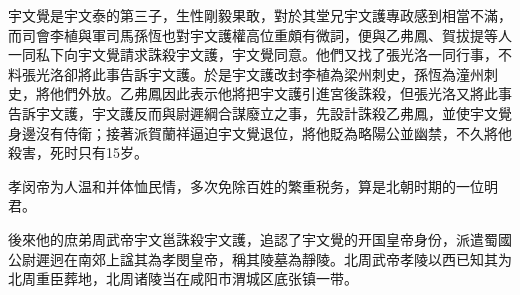 宇文覺是宇文泰的第三子，生性剛毅果敢，對於其堂兄宇文護專政感到相當不滿，而司會李植與軍司馬孫恆也對宇文護權高位重頗有微詞，便與乙弗鳳、賀拔提等人一同私下向宇文覺請求誅殺宇文護，宇文覺同意。他們又找了張光洛一同行事，不料張光洛卻將此事告訴宇文護。於是宇文護改封李植為梁州刺史，孫恆為潼州刺史，將他們外放。乙弗鳳因此表示他將把宇文護引進宮後誅殺，但張光洛又將此事告訴宇文護，宇文護反而與尉遲綱合謀廢立之事，先設計誅殺乙弗鳳，並使宇文覺身邊沒有侍衛；接著派賀蘭祥逼迫宇文覺退位，將他貶為略陽公並幽禁，不久將他殺害，死时只有15岁。

孝闵帝为人温和并体恤民情，多次免除百姓的繁重税务，算是北朝时期的一位明君。

後來他的庶弟周武帝宇文邕誅殺宇文護，追認了宇文覺的开国皇帝身份，派遣蜀國公尉遲迥在南郊上諡其為孝閔皇帝，稱其陵墓為靜陵。北周武帝孝陵以西已知其为北周重臣葬地，北周诸陵当在咸阳市渭城区底张镇一带。







